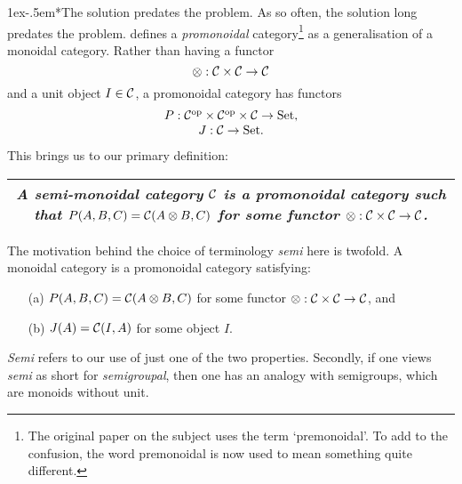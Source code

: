 \documentclass{robincs}
\makeatletter
\renewcommand\paragraph{\@startsection{paragraph}{4}{\z@}%
                {1ex}{-.5em}{\normalfont\normalsize\bfseries}}
\newcommand\smc   {semi-mon\-oid\-al category\xspace}
\newif\ifcomments\commentsfalse
\newcommand\comment[2][]{\ifcomments\marginpar{#1\raggedright\tiny#2}\fi}
\newcommand\dcomment{\comment[D]}%
\newlength{\tw}\setlength{\tw}{\textwidth}\addtolength{\tw}{-\arrayrulewidth}
\newenvironment{plainbox}{\begin{center}\begin{tabular}{@{}|c@{\hspace{1ex}}|@{}}\hline
 \begin{minipage}[b]{\tw}\vspace*{.1in}
 \begingroup\small\baselineskip13pt}{\endgroup\end{minipage} \\[1ex] \hline
 \end{tabular}\end{center}}
\makeatother
\begin{document}
\paragraph*{The solution predates the problem.} As so often, the solution 
long predates the problem.
%
\citet{DayPro} defines a \emph{promonoidal} category\footnote{
        The original paper on the subject \citep{DayPro}
        uses the term `premonoidal'. To add to the confusion,
        the word premonoidal is now used to mean something
        quite different.
} as a generalisation of a monoidal category.
%
Rather than having a functor \[\tn:\C\times\C\to\C\] and a unit object
$I\in\mathcal{C}$, a promonoidal category has functors
\[\begin{array}{c}
        P: \mathcal{C}^\mathrm{op}\times\mathcal{C}^\mathrm{op}\times\mathcal{C}\to\mathrm{Set},\\
        J: \mathcal{C} \to \mathrm{Set}.
\end{array}\]
 This brings us to our primary definition:
\begin{plainbox}
\it
        A \textbf{\smc}
        $\mathcal{C}$ is a promonoidal category 
        such that\comment[D]{rephrased (a) for more precision, and (b) for typesetting prettiness}
        $P(A,B,C) = \C(A\tn B,C)$ for some functor $\tn:\C\times\C\to\C$.
\end{plainbox}
The motivation behind the choice of terminology \emph{semi} here is
twofold.  A monoidal category is a promonoidal category
satisfying:
\begin{itemize}
   \item[(a)] $P(A,B,C) = \C(A\tn B,C)$ for some functor $\tn:\C\times\C\to\C$, and
%
   \item[(b)] $J(A) = \mathcal{C}(I,A)$ for some object $I$.
\end{itemize}
\emph{Semi} refers to our use of just one of the two properties.
%
Secondly,
if one views \emph{semi} as short for \emph{semigroupal}, then one has
an analogy with semigroups, which are monoids without unit.
%
\end{document}
